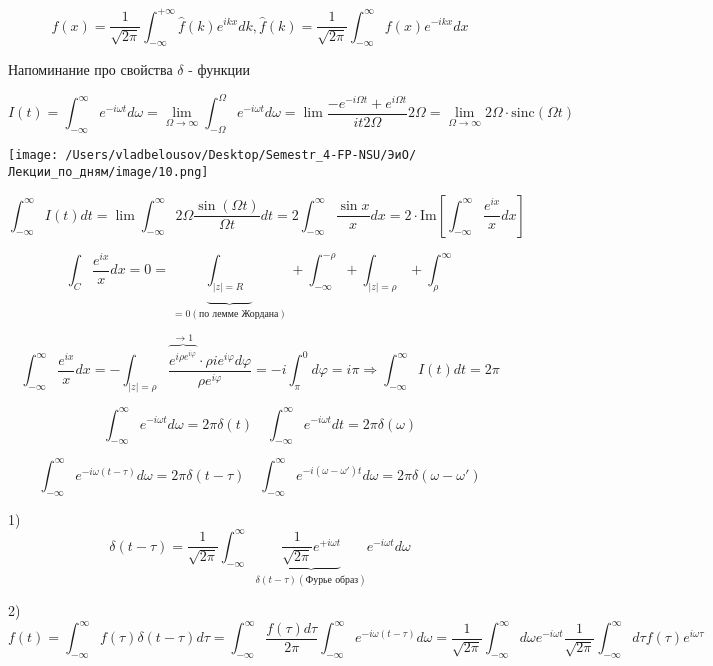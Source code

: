\documentclass[12pt, a4paper]{report}
\begin{document}
\[ f(x)= \frac{1}{\sqrt{2 \pi}}\int _{-\infty }^{+\infty} \hat{f}(k)e^{i k x }d k  , \hat{f}(k)= \frac{1}{\sqrt{2 \pi}} \int_{-\infty}^{\infty} f(x)e^{- ikx} dx    \] 

Напоминание про свойства \( \delta \) - функции

\[ I(t)= \int_{-\infty}^{\infty} e^{- i \omega t} d \omega = \lim_{\Omega \to \infty} \int_{-\Omega}^{\Omega}e^{- i \omega t} d \omega  = \lim \frac{-e^{-i \Omega t} + e^{i \Omega t}}{it 2 \Omega}  2 \Omega = \lim_{\Omega \to \infty}   2 \Omega  \cdot\mathrm{sinc}(\Omega t)    \] 

\begin{center}
    \texttt{[image: /Users/vladbelousov/Desktop/Semestr\_4-FP-NSU/ЭиО/Лекции\_по\_дням/image/10.png]}
\end{center}

\[ \int_{-\infty }^{\infty} I (t)dt =\lim \int_{-\infty}^{\infty} 2 \Omega \frac{\sin  ( \Omega t)}{\Omega t}dt = 2 \int_{- \infty }^{\infty} \frac{ \sin x}{x}dx = 2 \cdot \mathrm{Im} \left[ \int_{-\infty }^{\infty} \frac{e^{ix} }{x} dx \right]      \] 

\[ \int_{C} \frac{e^{ix} }{x} dx =0 = \underbrace{\int_{|z|= R}}_{=0(\text{по лемме Жордана}) }  + \int_{-\infty}^{-\rho} + \int_{|z|= \rho} + \int_{ \rho}^{\infty}       \] 

\[ \int_{-\infty}^{\infty} \frac{e^{ix} }{x} dx = - \int_{|z|=\rho} \frac{\overbrace{e^{i \rho e ^{i \varphi} }}^{\to 1 } \cdot \rho i e^{ i \varphi} d \varphi }{\rho e^{i \varphi}} =- i \int_{\pi}^{0} d \varphi= i \pi \Rightarrow \int_{-\infty }^{\infty} I ( t)dt = 2\pi      \] 

\[ \int_{-\infty }^{\infty}  e^{- i \omega t} d \omega = 2 \pi \delta ( t) \quad \int_{-\infty}^{\infty} e ^{ - i \omega t }dt = 2 \pi \delta(\omega)  \]

\[ \int_{-\infty}^{\infty}   e^{- i \omega( t - \tau)} d \omega = 2 \pi \delta ( t - \tau )\quad  \int_{-\infty}^{\infty}    e^{-i (\omega- \omega ') t} d \omega = 2 \pi \delta ( \omega- \omega' )   \] 

1)\[  \delta ( t- \tau )= \frac{1}{ \sqrt{ 2 \pi }} \int_{-\infty}^{  \infty} \underbrace{\frac{1}{ \sqrt{2\pi }} e^{+i \omega t} }_{\delta ( t - \tau) (\text{Фурье образ} )}e^{- i \omega  t} d \omega \] 

2)\[ f(t)= \int_{-\infty}^{\infty} f(\tau ) \delta ( t - \tau)d \tau = \int_{-\infty}^{\infty} \frac{f(\tau)d \tau}{2 \pi} \int_{-\infty}^{\infty} e^{- i \omega ( t - \tau ) }d \omega = \frac{1}{ \sqrt{2 \pi}} \int_{-\infty}^{\infty}  d \omega e ^{- i\omega t } \frac{1}{\sqrt{2 \pi}} \int_{-\infty}^{\infty} d \tau f( \tau) e^{i \omega \tau}       \] 
\end{document}
